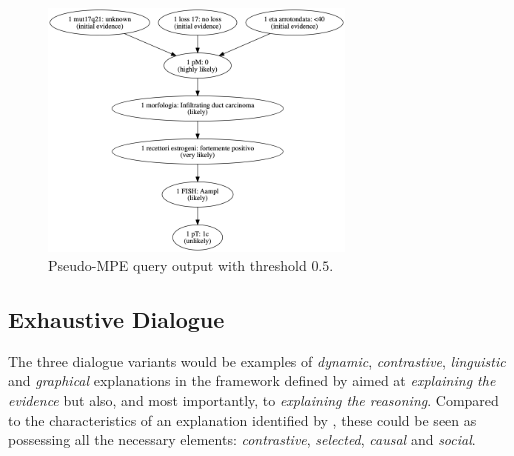 \begin{figure}[htbp]
\centerline{\includegraphics[width=0.7\textwidth]{results/images/pseudo_mpe_output}}
\caption{Pseudo-MPE query output with threshold $0.5$.}
\label{fig:pseudo_mpe_output}
\end{figure}
%
%

\subsection{Exhaustive Dialogue} \label{subsec:dialogue-results}
The three dialogue variants would be examples of \textit{dynamic}, \textit{contrastive}, \textit{linguistic} and \textit{graphical} explanations in the framework defined by \citet{lacave2002review} aimed at \textit{explaining the evidence} but also, and most importantly, to \textit{explaining the reasoning}.
Compared to the characteristics of an explanation identified by \citet{miller2018explanation}, these could be seen as possessing all the necessary elements: \textit{contrastive}, \textit{selected}, \textit{causal} and \textit{social}.


